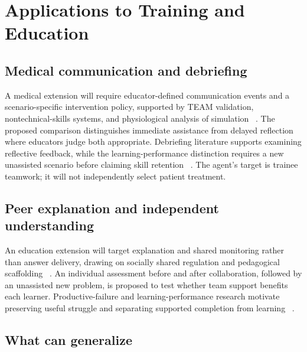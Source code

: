 \section{Applications to Training and Education}
\label{sec:9}

\subsection{Medical communication and debriefing}

A medical extension will require educator-defined communication events and a scenario-specific intervention policy, supported by TEAM validation, nontechnical-skills systems, and physiological analysis of simulation ~\cite{p66,p4,p67,p69}. The proposed comparison distinguishes immediate assistance from delayed reflection where educators judge both appropriate. Debriefing literature supports examining reflective feedback, while the learning-performance distinction requires a new unassisted scenario before claiming skill retention ~\cite{p9,p62}. The agent's target is trainee teamwork; it will not independently select patient treatment.


\subsection{Peer explanation and independent understanding}

An education extension will target explanation and shared monitoring rather than answer delivery, drawing on socially shared regulation and pedagogical scaffolding ~\cite{p29,p27,p51}. An individual assessment before and after collaboration, followed by an unassisted new problem, is proposed to test whether team support benefits each learner. Productive-failure and learning-performance research motivate preserving useful struggle and separating supported completion from learning ~\cite{p31,p62}.


\subsection{What can generalize}

